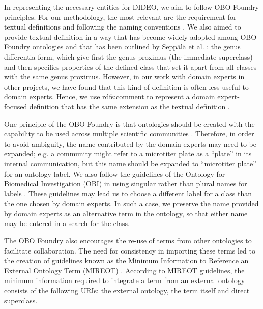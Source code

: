 \documentclass{bmcart}
\begin{document}
In representing the necessary entities for DIDEO, we aim to follow OBO Foundry principles.
For our methodology, the most relevant are the requirement for textual definitions and following the naming conventions \cite{obofoundry}.
We also aimed to provide textual definition in a way that has become widely adopted among OBO Foundry ontologies and that has been outlined by Sepp{\"a}l{\"a} et al. \cite{definition}: the genus differentia form, which give first the genus proximus (the immediate superclass) and then specifies properties of the defined class that set it apart from all classes with the same genus proximus.
However, in our work with domain experts in other projects, we have found that this kind of definition is often less useful to domain experts.
Hence, we use rdfs:comment to represent a domain expert-focused definition that has the same extension as the textual definition \cite{Utecht}.

One principle of the OBO Foundry is that ontologies should be created with the capability to be used across multiple scientific communities \cite{Ashburner2001}.
Therefore, in order to avoid ambiguity, the name contributed by the domain experts may need to be expanded; e.g. a community might refer to a microtiter plate as a ``plate'' in its internal communication, but this name should be expanded to ``microtiter plate'' for an ontology label.
We also follow the guidelines of the Ontology for Biomedical Investigation (OBI) in using singular rather than plural names for labels \cite{Bandrowski2016,Schober2009}.
These guidelines may lead us to choose a different label for a class than the one chosen by domain experts.
In such a case, we preserve the name provided by domain experts as an alternative term in the ontology, so that either name may be entered in a search for the class.

The OBO Foundry also encourages the re-use of terms from other ontologies to facilitate collaboration.
The need for consistency in importing these terms led to the creation of guidelines known as the Minimum Information to Reference an External Ontology Term (MIREOT) \cite{Courtot}.
According to MIREOT guidelines, the minimum information required to integrate a term from an external ontology consists of the following URIs: the external ontology, the term itself and direct superclass.
\end{document}
